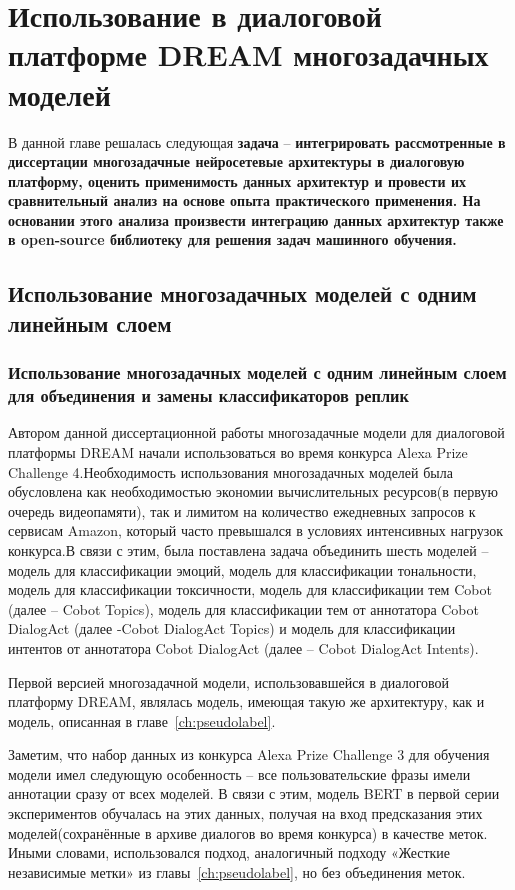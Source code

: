  \chapter{Использование в диалоговой платформе {DREAM} многозадачных моделей}\label{ch:mtldream}
В данной главе решалась следующая \textbf{задача} -- \textbf{интегрировать рассмотренные в диссертации многозадачные нейросетевые архитектуры в диалоговую платформу, оценить применимость данных архитектур и провести их сравнительный анализ на основе опыта практического применения. На основании этого анализа произвести интеграцию данных архитектур также в open-source библиотеку для решения задач машинного обучения.}

\section{Использование многозадачных моделей с одним линейным слоем }
\subsection{Использование многозадачных моделей с одним линейным слоем для объединения и замены классификаторов реплик}
Автором данной диссертационной работы многозадачные модели для диалоговой платформы {DREAM} начали использоваться во время конкурса Alexa Prize Challenge 4.Необходимость использования многозадачных моделей была обусловлена как необходимостью экономии вычислительных ресурсов(в первую очередь видеопамяти),
так и лимитом на количество ежедневных запросов к сервисам Amazon, который часто превышался в условиях интенсивных нагрузок конкурса.В связи с этим, была поставлена задача объединить шесть моделей -- модель для классификации эмоций, модель для классификации тональности, модель для классификации токсичности, модель для классификации тем Cobot (далее -- Cobot Topics), модель для классификации тем от аннотатора Cobot DialogAct (далее -Cobot DialogAct Topics) и модель для классификации интентов от аннотатора Cobot DialogAct (далее -- Cobot DialogAct Intents).

Первой версией многозадачной модели, использовавшейся в диалоговой платформу DREAM, являлась модель, имеющая такую же архитектуру,
как и модель, описанная в главе~\ref{ch:pseudolabel}.

Заметим, что набор данных из конкурса Alexa Prize Challenge 3 для обучения модели имел следующую особенность -- все пользовательские фразы имели аннотации сразу от всех моделей. В связи с этим, модель BERT в первой серии экспериментов обучалась на этих данных, получая на вход предсказания этих моделей(сохранённые в архиве диалогов во время конкурса) в качестве меток. Иными словами, использовался подход, аналогичный подходу «Жесткие независимые метки» из главы~\ref{ch:pseudolabel}, но без объединения меток. 
 
